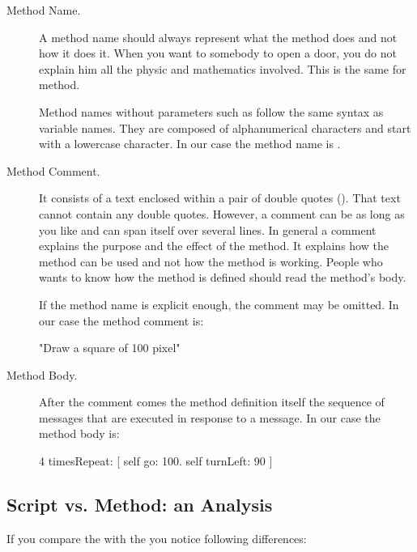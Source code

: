 
\begin{description}
\item[Method Name.] 
A method name should always represent what the method does 
and not how it does it.  When you want to somebody to open a door, 
you do not explain him all the physic and mathematics involved. This is the 
same for method. 

Method names without parameters such as 
 follow the same syntax as variable names. They are 
composed of alphanumerical characters and start with a
lowercase character. In our case the method name is .

\item[Method Comment.]
It consists of a text enclosed within a pair of double quotes
(). That text cannot contain any double quotes. However, a
comment can be as long as you like and can span itself
over several lines.  In general a comment explains the purpose and the 
effect of the method. It explains how the method can be used and not how 
the method is working. People who wants to know how the method is 
defined should read the method's body.

If the method name is explicit enough, the comment may be omitted.  
In our case the method comment is:
\begin{nalltt}
   "Draw a square of 100 pixel"
\end{nalltt}


\item[Method Body.] After the comment comes the method definition itself
\ie the sequence of messages that are executed in response to a message. In our case the 
method body is: 
\


\begin{nalltt}
   4 timesRepeat: 
         [ self go: 100.
         self turnLeft: 90 ]
\end{nalltt}
\end{description}
       

\subsection{Script vs. Method: an Analysis}
If you compare the  with the  you notice following differences:

